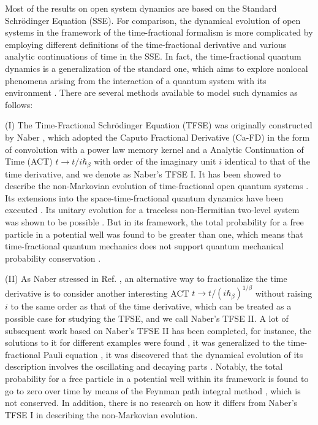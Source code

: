 \documentclass[
showpacs,  %
showkeys,  %
aps,       %
amsthm,    %
amsmath,   %
amsfonts,  %
amssymb    %
]{revtex4-1}          %
\begin{document}
Most of the results on open system dynamics are based on the Standard Schr\"{o}dinger Equation (SSE). For comparison, the dynamical evolution of open systems in the framework of the time-fractional formalism is more complicated by employing different definitions of the time-fractional derivative and various analytic continuations of time in the SSE. In fact, the time-fractional quantum dynamics is a generalization of the standard one, which aims to explore nonlocal phenomena arising from the interaction of a quantum system with its environment \cite{Naber2004,Iomin2009,Huang2011}. There are several methods available to model such dynamics as follows:

(I) The Time-Fractional Schr\"{o}dinger Equation (TFSE) was originally constructed by Naber \cite{Naber2004}, which adopted the Caputo Fractional Derivative (Ca-FD) in the form of convolution with a power law memory kernel \cite{Mainardi1996} and a Analytic Continuation of Time (ACT) $t\to t/i\hbar_\beta$ with order of the imaginary unit $i$ identical to that of the time derivative, and we denote as Naber's TFSE I. It has been showed to describe the non-Markovian evolution of time-fractional open quantum systems \cite{Iomin2009}. Its extensions into the space-time-fractional quantum dynamics have been executed \cite{Dong2008}. Its unitary evolution for a traceless non-Hermitian two-level system was shown to be possible \cite{Cius2022}. But in its framework, the total probability for a free particle in a potential well was found to be greater than one, which means that time-fractional quantum mechanics does not support quantum mechanical probability conservation \cite{Naber2004,Laskin2017}.

(II) As Naber stressed in Ref. \cite{Naber2004}, an alternative way to fractionalize the time derivative is to consider another interesting ACT $t\to t/{(i\hbar_\beta)^{1/\beta}}$ without raising $i$ to the same order as that of the time derivative, which can be treated as a possible case for studying the TFSE, and we call Naber's TFSE II. A lot of subsequent work based on Naber's TFSE II has been completed, for instance, the solutions to it for different examples were found \cite{Muslih2010}, it was generalized to the time-fractional Pauli equation \cite{Nasrolahpour2011}, it was discovered that the dynamical evolution of its description involves the oscillating and decaying parts \cite{Iomin2019}. Notably, the total probability for a free particle in a potential well within its framework is found to go to zero over time by means of the Feynman path integral method \cite{Achar2013}, which is not conserved. In addition, there is no research on how it differs from Naber's TFSE I in describing the non-Markovian evolution.
\end{document}
